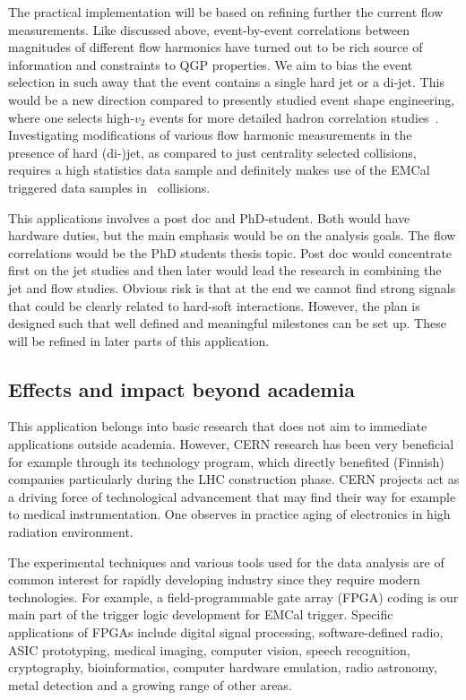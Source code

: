 The practical implementation will be based on refining further the current flow measurements. Like discussed above, event-by-event correlations between magnitudes of different flow harmonics have turned out to be rich source of information and constraints to QGP properties. We aim to bias the event selection in such away that the event contains a single hard jet or a di-jet. This would be a new direction compared to presently studied event shape engineering, where one selects high-$v_2$  events for more detailed hadron correlation studies~\cite{ALICE:2016kpq}. Investigating modifications of various flow harmonic measurements in the presence of hard (di-)jet, as compared to just centrality selected collisions, requires a high statistics data sample and definitely makes use of the EMCal triggered data samples in \pbpb\ collisions.

This applications involves a post doc and PhD-student. Both would have hardware duties, but the main emphasis would be on the analysis goals. The flow correlations would be the PhD students thesis topic. Post doc would concentrate first on the jet studies and then later would lead the research in combining the jet and flow studies. Obvious risk is that at the end we cannot find strong signals that could be clearly related to hard-soft interactions. However, the plan is designed such that well defined and meaningful milestones can be set up. These will be refined in later parts of this application.

\subsection{Effects and impact beyond academia}

This application belongs into basic research that does not aim to immediate applications outside academia. However, CERN research has been very beneficial for example through its technology program, which directly benefited (Finnish) companies particularly during the LHC construction phase. CERN projects act as a driving force of technological advancement that may find their way for example to medical instrumentation. One observes in practice aging of electronics in high radiation environment.

The experimental techniques and various tools used for the data analysis are of common interest for rapidly developing industry since they require modern technologies. For example, a field-programmable gate array (FPGA) coding is our main part of the trigger logic development for EMCal trigger. Specific applications of FPGAs include digital signal processing, software-defined radio, ASIC prototyping, medical imaging, computer vision, speech recognition, cryptography, bioinformatics, computer hardware emulation, radio astronomy, metal detection and a growing range of other areas.

